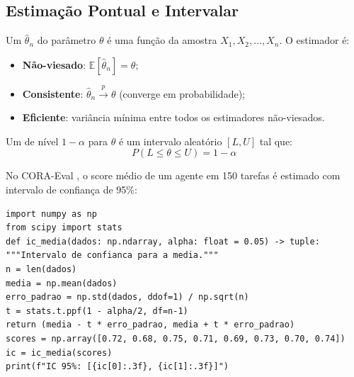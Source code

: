 \subsection{Estimação Pontual e Intervalar}
\begin{definicao}[Estimador]
Um  $\hat{\theta}_n$ do parâmetro $\theta$ é uma
função da amostra $X_1, X_2, \ldots, X_n$. O estimador é:
\begin{itemize}
\item \textbf{Não-viesado}: $\mathbb{E}[\hat{\theta}_n] = \theta$;
\item \textbf{Consistente}: $\hat{\theta}_n \xrightarrow{p} \theta$
(converge em probabilidade);
\item \textbf{Eficiente}: variância mínima entre todos os estimadores
não-viesados.
\end{itemize}
\end{definicao}
\begin{definicao}
Um  de nível $1 - \alpha$ para
$\theta$ é um intervalo aleatório $[L, U]$ tal que:
\[P(L \leq \theta \leq U) = 1 - \alpha
\]
\end{definicao}
\begin{exemplo}
No CORA-Eval \cite{laranjeira2026cora}, o score médio de um agente em
150 tarefas é estimado com intervalo de confiança de 95\%:
\begin{lstlisting}[style=pythonstyle]
import numpy as np
from scipy import stats
def ic_media(dados: np.ndarray, alpha: float = 0.05) -> tuple:
"""Intervalo de confianca para a media."""
n = len(dados)
media = np.mean(dados)
erro_padrao = np.std(dados, ddof=1) / np.sqrt(n)
t = stats.t.ppf(1 - alpha/2, df=n-1)
return (media - t * erro_padrao, media + t * erro_padrao)
scores = np.array([0.72, 0.68, 0.75, 0.71, 0.69, 0.73, 0.70, 0.74])
ic = ic_media(scores)
print(f"IC 95%: [{ic[0]:.3f}, {ic[1]:.3f}]")
\end{lstlisting}
\end{exemplo}
